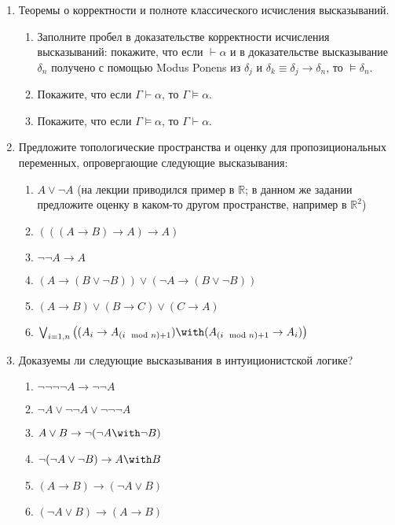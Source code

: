 \documentclass[10pt,a4paper,oneside]{article}
\begin{document}
\begin{enumerate}

\item Теоремы о корректности и полноте классического исчисления высказываний.
\begin{enumerate}
\item Заполните пробел в доказательстве корректности исчисления высказываний: 
покажите, что если $\vdash \alpha$ и в доказательстве высказывание
$\delta_n$ получено с помощью Modus Ponens из $\delta_j$ и $\delta_k \equiv \delta_j\rightarrow\delta_n$,
то $\models \delta_n$.

\item Покажите, что если $\Gamma \vdash \alpha$, то $\Gamma \models \alpha$.
\item Покажите, что если $\Gamma \models \alpha$, то $\Gamma \vdash \alpha$.
\end{enumerate}

\item Предложите топологические пространства и оценку для пропозициональных переменных,
опровергающие следующие высказывания:

\begin{enumerate}
\item $A \vee \neg A$ (на лекции приводился пример в $\mathbb{R}$; в данном же задании предложите оценку в 
каком-то другом пространстве, например в $\mathbb{R}^2$)
\item $(((A \rightarrow B) \rightarrow A) \rightarrow A)$
\item $\neg\neg A \rightarrow A$
\item $(A \rightarrow (B \vee \neg B)) \vee (\neg A \rightarrow (B \vee \neg B))$
\item $(A \rightarrow B) \vee (B \rightarrow C) \vee (C \rightarrow A)$
\item $\bigvee_{i=1,n} \left((A_i \rightarrow A_{(i\mod n) + 1}) \with (A_{(i\mod n)+1} \rightarrow A_i)\right)$
\end{enumerate}

\item Доказуемы ли следующие высказывания в интуиционистской логике?
\begin{enumerate}
\item $\neg\neg\neg\neg A \rightarrow \neg\neg A$
\item $\neg A \vee \neg\neg A \vee \neg\neg\neg A$
\item $A \vee B \rightarrow \neg (\neg A \with \neg B)$
\item $\neg (\neg A \vee \neg B) \rightarrow A \with B$
\item $(A \rightarrow B) \rightarrow (\neg A \vee B)$
\item $(\neg A \vee B) \rightarrow (A \rightarrow B)$
\end{enumerate}


\end{enumerate}
\end{document}
